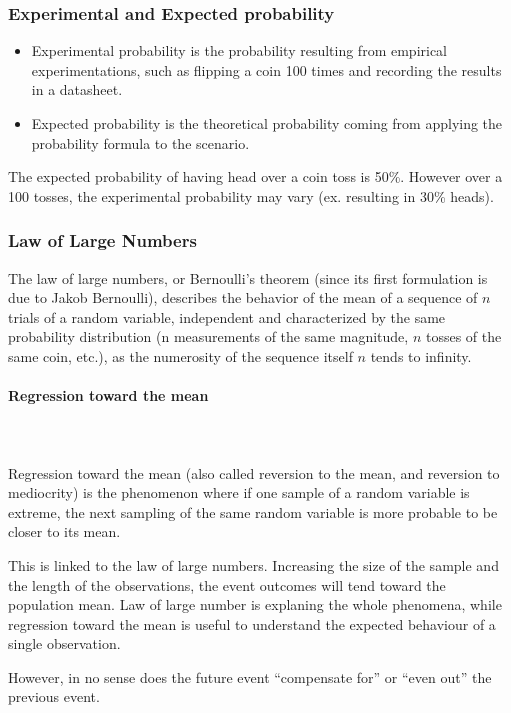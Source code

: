 \documentclass{article}
\begin{document}
\subsubsection{Experimental and Expected probability}

\begin{itemize}
    \item Experimental probability is the probability resulting from empirical experimentations, such as flipping a coin 100 times and recording the results in a datasheet.
    \item Expected probability is the theoretical probability coming from applying the probability formula to the scenario.
\end{itemize}

The expected probability of having head over a coin toss is 50\%. However over a 100 tosses, the experimental probability may vary (ex. resulting in 30\% heads).

\subsubsection{Law of Large Numbers}
The law of large numbers, or Bernoulli's theorem (since its first formulation is due to Jakob Bernoulli), describes the behavior of the mean of a sequence of $n$ trials of a random variable, independent and characterized by the same probability distribution (n measurements of the same magnitude, $n$ tosses of the same coin, etc.), as the numerosity of the sequence itself $n$ tends to infinity.

\paragraph{Regression toward the mean}\mbox{} \\
\mbox{} \\
Regression toward the mean (also called reversion to the mean, and reversion to mediocrity) is the phenomenon where if one sample of a random variable is extreme, the next sampling of the same random variable is more probable to be closer to its mean. 

This is linked to the law of large numbers. Increasing the size of the sample and the length of the observations, the event outcomes will tend toward the population mean. 
Law of large number is explaning the whole phenomena, while regression toward the mean is useful to understand the expected behaviour of a single observation.

However, in no sense does the future event “compensate for” or “even out” the previous event. 
\end{document}
